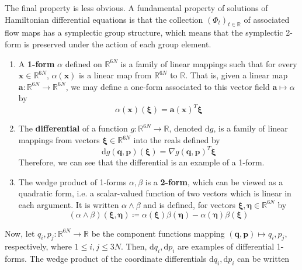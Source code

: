 \documentclass{article}
\begin{document}
      The final property is less obvious. A fundamental property of solutions of Hamiltonian differential equations is that the collection $(\Phi_t)_{t \in \mathbb{R}}$ of associated flow maps has a symplectic group structure, which means that the symplectic 2-form is preserved under the action of each group element. 
      \begin{enumerate}
        \item A \textbf{1-form} $\alpha$ defined on $\mathbb{R}^{6N}$ is a family of linear mappings such that for every $\mathbf{x} \in \mathbb{R}^{6N}$, $\alpha(\mathbf{x})$ is a linear map from $\mathbb{R}^{6N}$ to $\mathbb{R}$. That is, given a linear map $\mathbf{a}: \mathbb{R}^{6N} \longrightarrow \mathbb{R}^{6N}$, we may define a one-form associated to this vector field $\mathbf{a} \mapsto \alpha$ by 
        \begin{equation}
          \alpha(\mathbf{x}) (\boldsymbol{\xi}) = \mathbf{a} (\mathbf{x})^T \boldsymbol{\xi}
        \end{equation}
        \item The \textbf{differential} of a function $g: \mathbb{R}^{6N} \longrightarrow \mathbb{R}$, denoted $\mathrm{d}g$, is a family of linear mappings from vectors $\boldsymbol{\xi} \in \mathbb{R}^{6N}$ into the reals defined by 
        \begin{equation}
          \mathrm{d}g (\mathbf{q}, \mathbf{p}) (\boldsymbol{\xi}) = \nabla g(\mathbf{q}, \mathbf{p})^T \boldsymbol{\xi}
        \end{equation}
        Therefore, we can see that the differential is an example of a 1-form. 
        \item The wedge product of 1-forms $\alpha, \beta$ is a \textbf{2-form}, which can be viewed as a quadratic form, i.e. a scalar-valued function of two vectors which is linear in each argument. It is written $\alpha \wedge \beta$ and is defined, for vectors $\boldsymbol{\xi}, \boldsymbol{\eta} \in \mathbb{R}^{6N}$ by 
        \begin{equation}
          (\alpha \wedge \beta)(\boldsymbol{\xi}, \boldsymbol{\eta}) \coloneqq \alpha(\boldsymbol{\xi}) \beta(\boldsymbol{\eta}) - \alpha(\boldsymbol{\eta}) \beta(\boldsymbol{\xi})
        \end{equation}
      \end{enumerate}
      Now, let $q_i, p_j: \mathbb{R}^{6N} \longrightarrow \mathbb{R}$ be the component functions mapping $(\mathbf{q}, \mathbf{p}) \mapsto q_i, p_j$, respectively, where $1 \leq i, j \leq 3N$. Then, $\mathrm{d} q_i, \mathrm{d} p_i$ are examples of differential 1-forms. The wedge product of the coordinate differentials $\mathrm{d}q_i, \mathrm{d} p_i$ can be written
\end{document}
